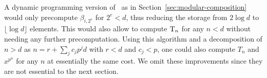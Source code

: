 \begin{remark}
  A dynamic programming version of~ as
  in Section~\ref{sec:modular-composition} would only precompute
  $\beta_{i,2^e}$ for $2^e<d$, thus reducing the storage from $2\log
  d$ to $\lfloor\log d\rfloor$ elements. This would also allow to
  compute $\operatorname{T}_n$ for any $n<d$ without needing any further
  precomputation. Using this algorithm and a decomposition of $n>d$ as
  $n=r+\sum_jc_jp^jd$ with $r<d$ and $c_j<p$, one could also compute
  $T_{n}$ and $x^{p^n}$ for any $n$ at essentially the same cost. We
  omit these improvements since they are not essential to the next
  section.
\end{remark}

%
